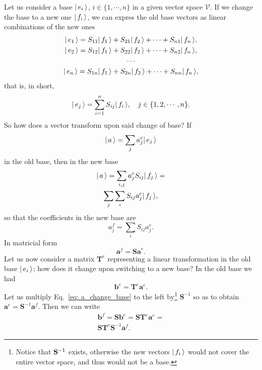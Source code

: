 Let us consider a base $| \, e_i \, \rangle$, $i \in \{1, \cdots, n \}$ in a given vector space $\mathcal{V}$. If we change the base to a new one $| \, f_i \, \rangle$, we can expres the old base vectors as linear combinations of the new ones
\begin{gather}
    | \, e_1 \, \rangle = S_{11} | \, f_1 \, \rangle + S_{21} | \, f_2 \, \rangle + \cdots + S_{n1} | \, f_n \, \rangle, \notag \\
    | \, e_2 \, \rangle = S_{12} | \, f_1 \, \rangle + S_{22} | \, f_2 \, \rangle + \cdots + S_{n2} | \, f_n \, \rangle, \notag \\
    \cdots \notag \\
    | \, e_n \, \rangle = S_{1n} | \, f_1 \, \rangle + S_{2n} | \, f_2 \, \rangle + \cdots + S_{nn} | \, f_n \, \rangle,
\end{gather}
that is, in short,
\begin{equation}
    \label{eq: old_base_new_base}
    | \, e_j \, \rangle = \sum_{i=1}^n S_{ij} | \, f_i \, \rangle, \quad j \in \{ 1, 2, \cdots , n \}.
\end{equation}
So how does a vector transform upon said change of base? If 
\begin{equation}
    | \, a \, \rangle = \sum_j a_j^e | \, e_j \, \rangle
\end{equation}
in the old base, then in the new base 
\begin{gather}
    | \, a \, \rangle = \sum_{i,j} a_j^{e} S_{ij} | \, f_j \, \rangle = \notag \\
    \sum_j \sum_i S_{ij} a_j^{e} | \, f_j \, \rangle,
\end{gather}
so that the coefficients in the new base are
\begin{equation}
    a_j^f = \sum_i S_{ij} a_j^e.
\end{equation}
In matricial form 
\begin{equation}
    \label{eq: a_change_base}
    \mathbf{a}^f = \mathbf{Sa}^e.
\end{equation}
Let us now consider a matrix $\mathbf{T}^e$ representing a linear transformation in the old base $ | \, e_i \, \rangle $; how does it change upon switching to a new base? In the old base we had
\begin{equation}
    \mathbf{b}^e = \mathbf{T}^e \mathbf{a}^e.
\end{equation}
Let us multiply Eq.~\eqref{eq: a_change_base} to the left by\footnote{Notice that $\mathbf{S}^{-1}$ exists, otherwise the new vectors $| \, f_i \, \rangle$ would not cover the entire vector space, and thus would not be a base.} $ \mathbf{S}^{-1} $ so as to obtain $ \mathbf{a}^e = \mathbf{S}^{-1} \mathbf{a}^f $. Then we can write
\begin{gather}
    \mathbf{b}^f = \mathbf{S} \mathbf{b}^e = \mathbf{S} \mathbf{T}^e \mathbf{a}^e = \\
    \mathbf{S} \mathbf{T}^e \mathbf{S}^{-1} \mathbf{a}^f.
\end{gather}
